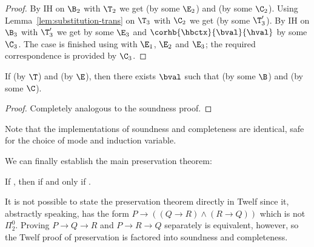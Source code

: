 \begin{proof}
By IH on $\B_2$ with $\T_2$ we get  (by some $\E_2$) and  (by some $\C_2$).
Using Lemma~\ref{lem:substitution-trans} on $\T_3$ with $\C_2$ we get  (by some $\T_3'$).
By IH on $\B_3$ with $\T_3'$ we get  by some $\E_3$ and $\corhb{\hbctx}{\bval}{\hval}$ by some $\C_3$.
The case is finished using  with $\E_1$, $\E_2$ and $\E_3$; the required correspondence is provided by $\C_3$.

\end{proof}

\begin{lemma}[Completeness]
\label{lem:completeness-hb}
If \trahb{\hbctx}{\benv}{\hexp}{\bexp} (by $\T$) and \hev{\hexp}{\hval} (by $\E$), then there exists $\bval$ such that \bev{\benv}{\bexp}{\bval} (by some $\B$) and \corhb{\hbctx}{\bval}{\hval} (by some $\C$).
\end{lemma}


\begin{proof}
Completely analogous to the soundness proof.
\end{proof}

\Twelf
Note that the implementations of soundness and completeness are identical, safe for the choice of mode and induction variable.

\vspace{0.5cm}

\noindent We can finally establish the main preservation theorem:

\begin{theorem}
\label{thm:preservation-hb} If \trahb{\hbctx}{\envnil}{\bexp}{\hexp}, then \hev{\hexp}{\n{\nat}} if and only if \bev{\envnil}{\bexp}{\n{\nat}}.
\end{theorem}


\Twelf
It is not possible to state the preservation theorem directly in Twelf since it, abstractly speaking, has the form $P \rightarrow ((Q \rightarrow R) \wedge (R \rightarrow Q))$ which is not $\Pi_2^0$.
Proving $P \rightarrow Q \rightarrow R$ and $P \rightarrow R \rightarrow Q$ separately is equivalent, however, so the Twelf proof of preservation is factored into soundness and completeness.

